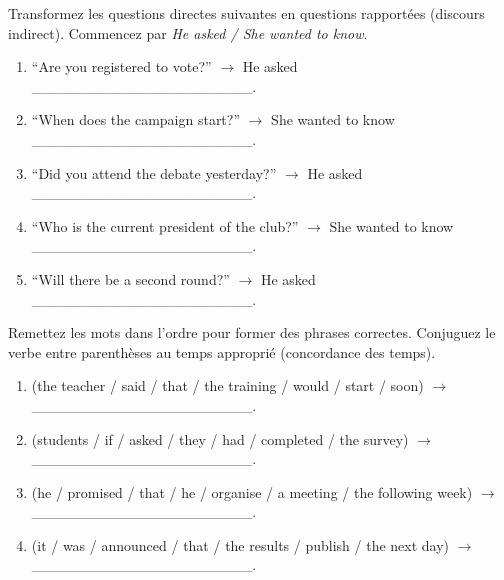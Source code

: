 \documentclass[11pt]{article}
\begin{document}
\begin{exercice}
Transformez les questions directes suivantes en questions rapportées (discours indirect). Commencez par \textit{He asked / She wanted to know}.
\begin{enumerate}
    \item ``Are you registered to vote?'' $\rightarrow$ He asked \_\_\_\_\_\_\_\_\_\_\_\_\_\_\_\_\_\_\_\_\_.
    \item ``When does the campaign start?'' $\rightarrow$ She wanted to know \_\_\_\_\_\_\_\_\_\_\_\_\_\_\_\_\_\_\_\_\_.
    \item ``Did you attend the debate yesterday?'' $\rightarrow$ He asked \_\_\_\_\_\_\_\_\_\_\_\_\_\_\_\_\_\_\_\_\_.
    \item ``Who is the current president of the club?'' $\rightarrow$ She wanted to know \_\_\_\_\_\_\_\_\_\_\_\_\_\_\_\_\_\_\_\_\_.
    \item ``Will there be a second round?'' $\rightarrow$ He asked \_\_\_\_\_\_\_\_\_\_\_\_\_\_\_\_\_\_\_\_\_.
\end{enumerate}
\end{exercice}

\begin{exercice}
Remettez les mots dans l'ordre pour former des phrases correctes. Conjuguez le verbe entre parenthèses au temps approprié (concordance des temps).
\begin{enumerate}
    \item (the teacher / said / that / the training / would / start / soon) $\rightarrow$ \_\_\_\_\_\_\_\_\_\_\_\_\_\_\_\_\_\_\_\_\_.
    \item (students / if / asked / they / had / completed / the survey) $\rightarrow$ \_\_\_\_\_\_\_\_\_\_\_\_\_\_\_\_\_\_\_\_\_.
    \item (he / promised / that / he / organise / a meeting / the following week) $\rightarrow$ \_\_\_\_\_\_\_\_\_\_\_\_\_\_\_\_\_\_\_\_\_.
    \item (it / was / announced / that / the results / publish / the next day) $\rightarrow$ \_\_\_\_\_\_\_\_\_\_\_\_\_\_\_\_\_\_\_\_\_.
\end{enumerate}
\end{exercice}
\end{document}

